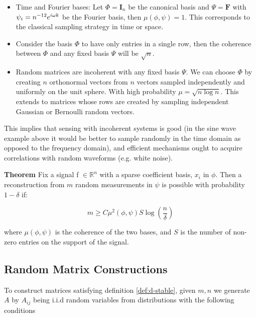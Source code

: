\begin{itemize}
\item Time and Fourier bases: Let \(\Phi = \textbf{I}_n\) be the canonical basis and \(\Psi = \textbf{F}\) with \(\psi_i = n^{-1\\2}e^{i\omega k} \) be the Fourier basis, then \(\mu\left(\phi, \psi\right) = 1\). This corresponds to the classical sampling strategy in time or space.
\item Consider the basis \(\Phi\) to have only entries in a single row, then the coherence between \(\Phi\) and any fixed basis \(\Psi\) will be \(\sqrt{n}\).
\item Random matrices are incoherent with any fixed basis \(\Psi\). We can choose \(\Phi\) by creating \(n\) orthonormal vectors from \(n\) vectors sampled independently and uniformly on the unit sphere. With high probability \(\mu = \sqrt{n\log{n}}\). This extends to matrices whose rows are created by sampling independent Gaussian or Bernoulli random vectors.
\end{itemize}

This implies that sensing with incoherent systems is good (in the sine wave example above it would be better to sample randomly in the time domain as opposed to the frequency domain), and efficient mechanisms ought to acquire correlations with random waveforms (e.g. white noise).

\textbf{Theorem} \cite{Candes2006}
Fix a signal f \(\in \mathbb{R}^n\) with a sparse coefficient basis, \(x_{i}\) in \(\phi\). Then a reconstruction from \(m\) random measurements in \(\psi\) is possible with probability \(1 - \delta\) if: 

\begin{equation}
m \geq C \mu^2(\phi, \psi) S \log\left(\frac{n}{\delta}\right)
\end{equation}
\label{minsamples}

where \( \mu(\phi, \psi)\) is the coherence of the two bases, and \(S\) is the number of non-zero entries on the support of the signal.

\subsection{Random Matrix Constructions} \label{sec:mtx-contruction}

To construct matrices satisfying definition \ref{def:d-stable}, given \(m, n\) we generate \(A\) by \(A_{ij}\) being i.i.d random variables from distributions with the following conditions \cite{davenport2010signal}

